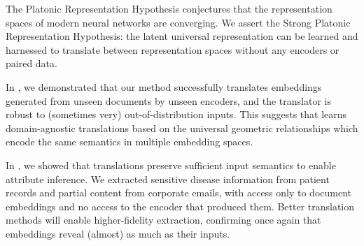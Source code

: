 

The Platonic Representation Hypothesis conjectures that the representation spaces of modern neural networks are converging.   We assert the Strong Platonic Representation Hypothesis: the latent universal representation can be learned and harnessed to translate between representation spaces without any encoders or paired data.

In , we demonstrated 
that our \atk{} method successfully translates embeddings generated from unseen documents by unseen encoders, and the translator is robust to (sometimes very) out-of-distribution inputs.  This suggests that \atk{} learns domain-agnostic translations based on the universal geometric relationships which encode the same semantics in multiple embedding spaces.


In , we showed that \atk{} translations preserve sufficient input semantics to enable attribute inference. 
We extracted sensitive disease information from patient records and partial content from corporate emails, with access only to document embeddings and no access to the encoder that produced them.  Better translation methods will enable higher-fidelity extraction, confirming once again that embeddings reveal (almost) as much as their inputs.

